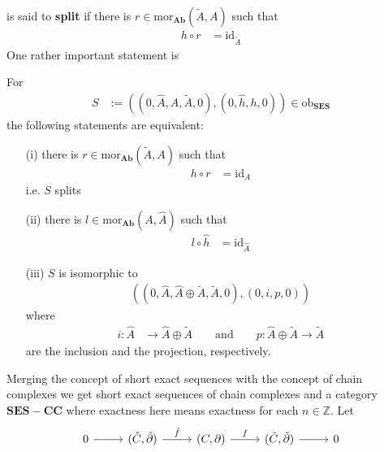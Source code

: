 is said to \textbf{split} if there is $r \in \mathrm{mor}_{\mathbf{Ab}}(\tilde{A},A)$ such that
\begin{align*}
  h
  \circ
  r
  &=
  \mathrm{id}_{\tilde{A}}
\end{align*}
One rather important statement is
\\
\begin{lem}
\label{lem:split}
For
\begin{align*}
  S
  &:=
  \left(
    \left(
      0
      ,
      \hat{A}
      ,
      A
      ,
      \tilde{A}
      ,
      0
    \right)
    ,
    (0,\hat{h},h,0)
  \right)
  \in
  \mathrm{ob}_{\mathbf{SES}}
\end{align*}
the following statements are equivalent:
\begin{enumerate}
\item[(i)]
there is $r \in \mathrm{mor}_{\mathbf{Ab}}(\tilde{A},A)$ such that
\begin{align*}
  h
  \circ
  r
  &=
  \mathrm{id}_{A}
\end{align*}
i.e. $S$ splits

\item[(ii)]
there is $l \in \mathrm{mor}_{\mathbf{Ab}}(A,\hat{A})$ such that
\begin{align*}
  l
  \circ
  \hat{h}
  &=
  \mathrm{id}_{\hat{A}}
\end{align*}

\item[(iii)]
$S$ is isomorphic to
\begin{align*}
  \left(
    \left(
      0
      ,
      \hat{A}
      ,
      \hat{A}
      \oplus
      \tilde{A}
      ,
      \tilde{A}
      ,
      0
    \right)
    ,
    (0,i,p,0)
  \right)
\end{align*}
where
\begin{align*}
  i
  \colon
  \hat{A}
  &\to
  \hat{A}
  \oplus
  \tilde{A}
  \qquad
  \text{and}
  \qquad
  p
  \colon
  \hat{A}
  \oplus
  \tilde{A}
  \to
  \tilde{A}
\end{align*}
are the inclusion and the projection, respectively.
\end{enumerate}
\end{lem}
Merging the concept of short exact sequences with the concept of chain complexes we get short exact sequences of chain complexes and a category $\mathbf{SES-CC}$ where exactness here means exactness for each $n \in \mathbb{Z}$. Let
\begin{equation*}
\begin{tikzcd}[row sep=2.2em,column sep=2.6em]
  0
  \ar{r}
  &
  (\hat{C},\hat{\partial})
  \ar{r}{\hat{f}}
  &
  (C,\partial)
  \ar{r}{f}
  &
  (\tilde{C},\tilde{\partial})
  \ar{r}
  &
  0
\end{tikzcd}
\end{equation*}
